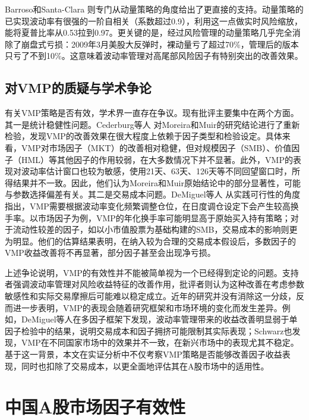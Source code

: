 \documentclass[
    decl-page,
    oneside,
  ]{njuthesis}
\begin{document}
Barroso和Santa-Clara \cite{barroso2015momentum} 则专门从动量策略的角度给出了更直接的支持。动量策略的已实现波动率有很强的一阶自相关（系数超过0.9），利用这一点做实时风险缩放，能将夏普比率从0.53拉到0.97。更关键的是，经过风险管理的动量策略几乎完全消除了崩盘式亏损：2009年3月美股大反弹时，裸动量亏了超过70\%，管理后的版本只亏了不到10\%。这意味着波动率管理对高尾部风险因子有特别突出的改善效果。

\subsection{对VMP的质疑与学术争论}

有关VMP策略是否有效，学术界一直存在争议。现有批评主要集中在两个方面。其一是统计稳健性问题。Cederburg等人 \cite{cederburg2020performance}对Moreira和Muir的研究结论进行了重新检验，发现VMP的改善效果在很大程度上依赖于因子类型和检验设定。具体来看，VMP对市场因子（MKT）的改善相对稳健，但对规模因子（SMB）、价值因子（HML）等其他因子的作用较弱，在大多数情况下并不显著。此外，VMP的表现对波动率估计窗口也较为敏感，使用21天、63天、126天等不同回望窗口时，所得结果并不一致。因此，他们认为Moreira和Muir原始结论中的部分显著性，可能与参数选择偏差有关。其二是交易成本问题。DeMiguel等人 \cite{demiguel2024transaction}从实践可行性的角度指出，VMP需要根据波动率变化频繁调整仓位，在日度调仓设定下会产生较高换手率。以市场因子为例，VMP的年化换手率可能明显高于原始买入持有策略；对于流动性较差的因子，如以小市值股票为基础构建的SMB，交易成本的影响则更为明显。他们的估算结果表明，在纳入较为合理的交易成本假设后，多数因子的VMP收益改善将不再显著，部分因子甚至会出现净亏损。

上述争论说明，VMP的有效性并不能被简单视为一个已经得到定论的问题。支持者强调波动率管理对风险收益特征的改善作用，批评者则认为这种改善在考虑参数敏感性和实际交易摩擦后可能难以稳定成立。近年的研究并没有消除这一分歧，反而进一步表明，VMP的表现会随着研究框架和市场环境的变化而发生差异。例如，DeMiguel等人\cite{demiguel2024multifactor}在多因子框架下发现，波动率管理带来的收益改善明显弱于单因子检验中的结果，说明交易成本和因子拥挤可能限制其实际表现；Schwarz\cite{schwarz2025international}也发现，VMP在不同国家市场中的效果并不一致，在新兴市场中的表现尤其不稳定。基于这一背景，本文在实证分析中不仅考察VMP策略是否能够改善因子收益表现，同时也扣除了交易成本，以更全面地评估其在A股市场中的适用性。

\section{中国A股市场因子有效性}
\end{document}
